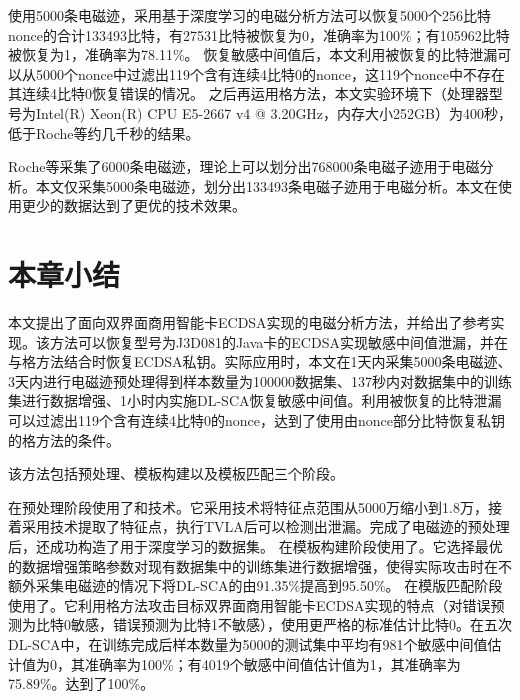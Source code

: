 {{{	使用5000条电磁迹，采用基于深度学习的电磁分析方法可以恢复5000个256比特nonce的合计133493比特，有27531比特被恢复为0，准确率为100\%；有105962比特被恢复为1，准确率为78.11\%。
	恢复敏感中间值后，本文利用被恢复的比特泄漏可以从5000个nonce中过滤出119个含有连续4比特0的nonce，这119个nonce中不存在其连续4比特0恢复错误的情况。
	之后再运用格方法，本文实验环境下（处理器型号为Intel(R) Xeon(R) CPU E5-2667 v4 @ 3.20GHz，内存大小252GB）为400秒，低于Roche等\citep{Roche21}约几千秒的结果。
	
	Roche等\citep{Roche21}采集了6000条电磁迹，理论上可以划分出768000条电磁子迹用于电磁分析。本文仅采集5000条电磁迹，划分出133493条电磁子迹用于电磁分析。本文在使用更少的数据达到了更优的技术效果。
	
	}

	\section{本章小结}
	{\color{\xchange}
	
%	
	本文提出了面向双界面商用智能卡ECDSA实现的电磁分析方法，并给出了参考实现。该方法可以恢复型号为J3D081的Java卡的ECDSA实现敏感中间值泄漏，并在与格方法结合时恢复ECDSA私钥。实际应用时，本文在1天内采集5000条电磁迹、3天内进行电磁迹预处理得到样本数量为100000数据集、137秒内对数据集中的训练集进行数据增强、1小时内实施DL-SCA恢复敏感中间值。利用被恢复的比特泄漏可以过滤出119个含有连续4比特0的nonce，达到了使用由nonce部分比特恢复私钥的格方法的条件。
	
	该方法包括预处理、模板构建以及模板匹配三个阶段。
	
	在预处理阶段使用了\poifanwei 和\yuchuli 技术。它采用\poifanwei 技术将特征点范围从5000万缩小到1.8万，接着采用\yuchuli 技术提取了特征点，执行TVLA后可以检测出泄漏。完成了电磁迹的预处理后，还成功构造了用于深度学习的数据集。
	在模板构建阶段使用了\shujuzengqiang。它选择最优的数据增强策略参数对现有数据集中的训练集进行数据增强，使得实际攻击时在不额外采集电磁迹的情况下将DL-SCA的\zyx 由91.35\%提高到95.50\%。
	在模版匹配阶段使用了\jiashejianyanguji。它利用格方法攻击目标双界面商用智能卡ECDSA实现的特点（对错误预测为比特0敏感，错误预测为比特1不敏感），使用更严格的标准估计比特0。在五次DL-SCA中，在训练完成后样本数量为5000的测试集中平均有981个敏感中间值估计值为0，其准确率为100\%；有4019个敏感中间值估计值为1，其准确率为75.89\%。\zyx 达到了100\%。
	
}}}
